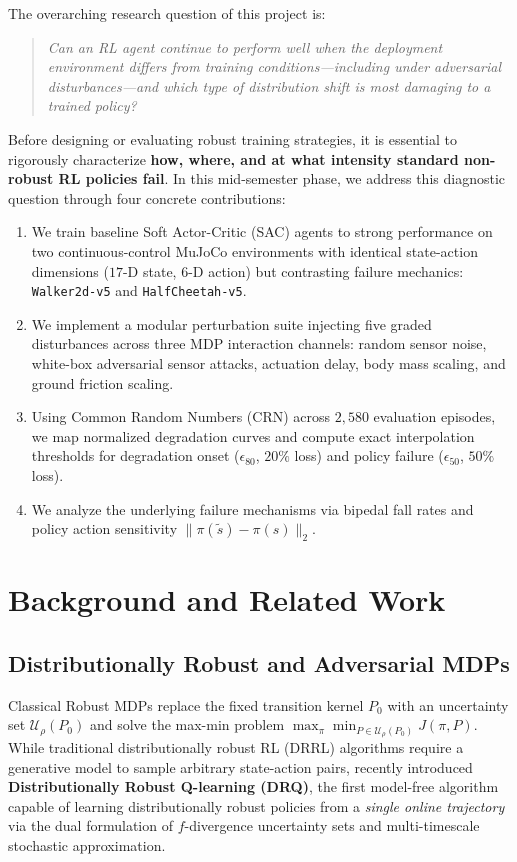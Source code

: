\documentclass{article}
\begin{document}
The overarching research question of this project is:
\begin{quote}
\emph{Can an RL agent continue to perform well when the deployment environment differs from training conditions---including under adversarial disturbances---and which type of distribution shift is most damaging to a trained policy?}
\end{quote}

Before designing or evaluating robust training strategies, it is essential to rigorously characterize \textbf{how, where, and at what intensity standard non-robust RL policies fail}. In this mid-semester phase, we address this diagnostic question through four concrete contributions:
\begin{enumerate}
    \item We train baseline Soft Actor-Critic (SAC) \citep{haarnoja2018soft} agents to strong performance on two continuous-control MuJoCo environments with identical state-action dimensions ($17\text{-D}$ state, $6\text{-D}$ action) but contrasting failure mechanics: \texttt{Walker2d-v5} and \texttt{HalfCheetah-v5}.
    \item We implement a modular perturbation suite injecting five graded disturbances across three MDP interaction channels: random sensor noise, white-box adversarial sensor attacks, actuation delay, body mass scaling, and ground friction scaling.
    \item Using Common Random Numbers (CRN) across $2{,}580$ evaluation episodes, we map normalized degradation curves and compute exact interpolation thresholds for degradation onset ($\epsilon_{80}$, $20\%$ loss) and policy failure ($\epsilon_{50}$, $50\%$ loss).
    \item We analyze the underlying failure mechanisms via bipedal fall rates and policy action sensitivity $\|\pi(\tilde{s}) - \pi(s)\|_2$.
\end{enumerate}


\section{Background and Related Work}

\subsection{Distributionally Robust and Adversarial MDPs}
Classical Robust MDPs replace the fixed transition kernel $P_0$ with an uncertainty set $\mathcal{U}_\rho(P_0)$ and solve the max-min problem $\max_\pi \min_{P \in \mathcal{U}_\rho(P_0)} J(\pi, P)$. While traditional distributionally robust RL (DRRL) algorithms require a generative model to sample arbitrary state-action pairs, \citet{liang2024single} recently introduced \textbf{Distributionally Robust Q-learning (DRQ)}, the first model-free algorithm capable of learning distributionally robust policies from a \emph{single online trajectory} via the dual formulation of $f$-divergence uncertainty sets and multi-timescale stochastic approximation.
\end{document}
